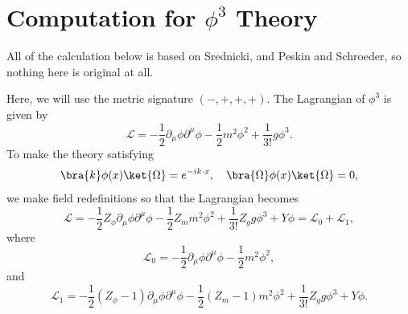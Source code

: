 \section{Computation for $\phi^3$ Theory}
All of the calculation below is based on Srednicki, and Peskin and Schroeder, so nothing here is original at all.

Here, we will use the metric signature $(-,+,+,+)$. The Lagrangian of $\phi^3$ is given by
\begin{equation}
    \mathcal{L} = -\frac{1}{2}\partial_\mu \phi \partial^\mu \phi - \frac{1}{2}m^2\phi^2 + \frac{1}{3!}g\phi^3.
\end{equation}
To make the theory satisfying
\begin{equation}
    \bra{k}\phi(x)\ket{\Omega} = e^{-ik\cdot x},\quad \bra{\Omega}\phi(x)\ket{\Omega} = 0,
\end{equation}
we make field redefinitions so that the Lagrangian becomes
\begin{equation}
    \mathcal{L} = -\frac{1}{2}Z_\phi\partial_\mu \phi \partial^\mu \phi - \frac{1}{2}Z_mm^2\phi^2 + \frac{1}{3!}Z_gg\phi^3 + Y\phi = \mathcal{L}_0 + \mathcal{L}_1,
\end{equation}
where 
\begin{equation}
    \mathcal{L}_0 = -\frac{1}{2}\partial_\mu \phi \partial^\mu \phi - \frac{1}{2}m^2\phi^2,
\end{equation}
and
\begin{equation}
    \mathcal{L}_1 = -\frac{1}{2}(Z_\phi-1)\partial_\mu \phi \partial^\mu \phi - \frac{1}{2}(Z_m-1)m^2\phi^2 + \frac{1}{3!}Z_gg\phi^3 + Y\phi.
\end{equation}

